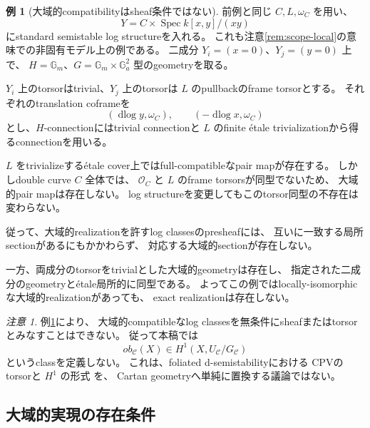 \documentclass[uplatex,dvipdfmx,11pt]{jsarticle}
\numberwithin{equation}{section}
\theoremstyle{plain}
\theoremstyle{definition}
\newtheorem{example}[theorem]{例}
\theoremstyle{remark}
\newtheorem{remark}[theorem]{注意}
\DeclareMathOperator{\Spec}{Spec}
\DeclareMathOperator{\dlog}{dlog}
\newcommand{\OO}{\mathcal O}
\newcommand{\GG}{\mathbb G}
\newcommand{\calC}{\mathcal C}
\begin{document}
\begin{example}[大域的compatibilityはsheaf条件ではない]
\label{ex:compatible-presheaf}
前例と同じ \(C,L,\omega_C\) を用い、
\[
Y=C\times\Spec k[x,y]/(xy)
\]
にstandard semistable log structureを入れる。
これも注意\ref{rem:scope-local}の意味での非固有モデル上の例である。
二成分 \(Y_i=(x=0)\)、\(Y_j=(y=0)\) 上で、
\(H=\GG_m\)、\(G=\GG_m\times\GG_a^2\) 型のgeometryを取る。

\(Y_i\) 上のtorsorはtrivial、\(Y_j\) 上のtorsorは \(L\) のpullbackのframe torsorとする。
それぞれのtranslation coframeを
\[
(\dlog y,\omega_C),\qquad
(-\dlog x,\omega_C)
\]
とし、\(H\)-connectionにはtrivial connectionと
\(L\) のfinite étale trivializationから得るconnectionを用いる。

\(L\) をtrivializeするétale cover上ではfull-compatibleなpair mapが存在する。
しかしdouble curve \(C\) 全体では、
\(\OO_C\) と \(L\) のframe torsorsが同型でないため、
大域的pair mapは存在しない。
log structureを変更してもこのtorsor同型の不存在は変わらない。

従って、大域的realizationを許すlog classesのpresheafには、
互いに一致する局所sectionがあるにもかかわらず、
対応する大域的sectionが存在しない。

一方、両成分のtorsorをtrivialとした大域的geometryは存在し、
指定された二成分のgeometryとétale局所的に同型である。
よってこの例ではlocally-isomorphicな大域的realizationがあっても、
exact realizationは存在しない。
\end{example}

\begin{remark}
\label{rem:no-h1-class}
例\ref{ex:compatible-presheaf}により、
大域的compatibleなlog classesを無条件にsheafまたはtorsorとみなすことはできない。
従って本稿では
\[
ob_{\calC}(X)\in H^1(X,U_{\calC}/G_{\calC})
\]
というclassを定義しない。
これは、foliated d-semistabilityにおける
CPVのtorsorと \(H^1\) の形式 \cite{CPV}を、
Cartan geometryへ単純に置換する議論ではない。
\end{remark}

\subsection{大域的実現の存在条件}
\end{document}
